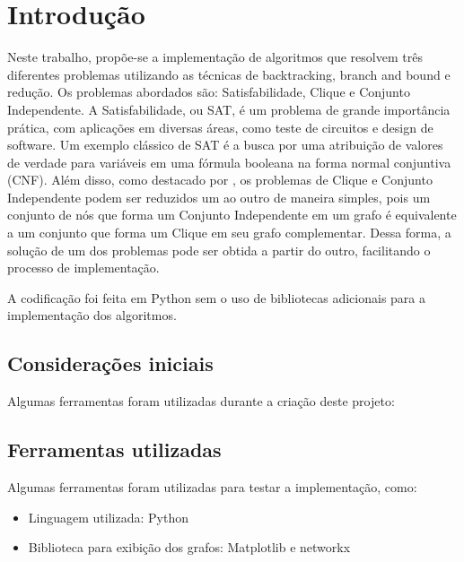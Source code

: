 \documentclass[12pt]{article}
\begin{document}
\onehalfspacing



\section{Introdução}
    Neste trabalho, propõe-se a implementação de algoritmos que resolvem três diferentes problemas utilizando as técnicas de backtracking, branch and bound e redução. Os problemas abordados são: Satisfabilidade, Clique e Conjunto Independente. A Satisfabilidade, ou SAT, é um problema de grande importância prática, com aplicações em diversas áreas, como teste de circuitos e design de software. Um exemplo clássico de SAT é a busca por uma atribuição de valores de verdade para variáveis em uma fórmula booleana na forma normal conjuntiva (CNF). Além disso, como destacado por \citep{dasgupta2006algorithms}, os problemas de Clique e Conjunto Independente podem ser reduzidos um ao outro de maneira simples, pois um conjunto de nós que forma um Conjunto Independente em um grafo é equivalente a um conjunto que forma um Clique em seu grafo complementar. Dessa forma, a solução de um dos problemas pode ser obtida a partir do outro, facilitando o processo de implementação.
    
    
    A codificação foi feita em Python sem o uso de bibliotecas adicionais para a implementação dos algoritmos.

\subsection{Considerações iniciais}

Algumas ferramentas foram utilizadas durante a criação deste projeto:

\subsection{Ferramentas utilizadas}
Algumas ferramentas foram utilizadas para testar a implementação, como:
\begin{itemize}
    \item Linguagem utilizada: Python
    \item Biblioteca para exibição dos grafos: Matplotlib e networkx
\end{itemize}
\end{document}
